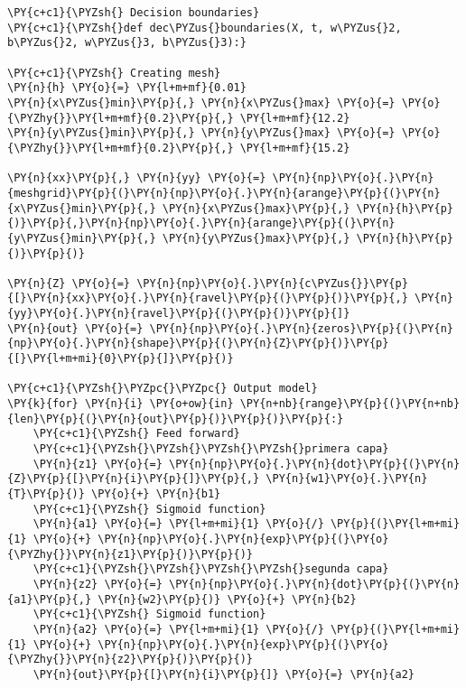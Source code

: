     \begin{tcolorbox}[breakable, size=fbox, boxrule=1pt, pad at break*=1mm,colback=cellbackground, colframe=cellborder]
\begin{Verbatim}[commandchars=\\\{\}]
\PY{c+c1}{\PYZsh{} Decision boundaries}
\PY{c+c1}{\PYZsh{}def dec\PYZus{}boundaries(X, t, w\PYZus{}2, b\PYZus{}2, w\PYZus{}3, b\PYZus{}3):}
    
\PY{c+c1}{\PYZsh{} Creating mesh}
\PY{n}{h} \PY{o}{=} \PY{l+m+mf}{0.01}
\PY{n}{x\PYZus{}min}\PY{p}{,} \PY{n}{x\PYZus{}max} \PY{o}{=} \PY{o}{\PYZhy{}}\PY{l+m+mf}{0.2}\PY{p}{,} \PY{l+m+mf}{12.2}
\PY{n}{y\PYZus{}min}\PY{p}{,} \PY{n}{y\PYZus{}max} \PY{o}{=} \PY{o}{\PYZhy{}}\PY{l+m+mf}{0.2}\PY{p}{,} \PY{l+m+mf}{15.2}
 
\PY{n}{xx}\PY{p}{,} \PY{n}{yy} \PY{o}{=} \PY{n}{np}\PY{o}{.}\PY{n}{meshgrid}\PY{p}{(}\PY{n}{np}\PY{o}{.}\PY{n}{arange}\PY{p}{(}\PY{n}{x\PYZus{}min}\PY{p}{,} \PY{n}{x\PYZus{}max}\PY{p}{,} \PY{n}{h}\PY{p}{)}\PY{p}{,}\PY{n}{np}\PY{o}{.}\PY{n}{arange}\PY{p}{(}\PY{n}{y\PYZus{}min}\PY{p}{,} \PY{n}{y\PYZus{}max}\PY{p}{,} \PY{n}{h}\PY{p}{)}\PY{p}{)}
 
\PY{n}{Z} \PY{o}{=} \PY{n}{np}\PY{o}{.}\PY{n}{c\PYZus{}}\PY{p}{[}\PY{n}{xx}\PY{o}{.}\PY{n}{ravel}\PY{p}{(}\PY{p}{)}\PY{p}{,} \PY{n}{yy}\PY{o}{.}\PY{n}{ravel}\PY{p}{(}\PY{p}{)}\PY{p}{]}
\PY{n}{out} \PY{o}{=} \PY{n}{np}\PY{o}{.}\PY{n}{zeros}\PY{p}{(}\PY{n}{np}\PY{o}{.}\PY{n}{shape}\PY{p}{(}\PY{n}{Z}\PY{p}{)}\PY{p}{[}\PY{l+m+mi}{0}\PY{p}{]}\PY{p}{)}
 
\PY{c+c1}{\PYZsh{}\PYZpc{}\PYZpc{} Output model}
\PY{k}{for} \PY{n}{i} \PY{o+ow}{in} \PY{n+nb}{range}\PY{p}{(}\PY{n+nb}{len}\PY{p}{(}\PY{n}{out}\PY{p}{)}\PY{p}{)}\PY{p}{:}
    \PY{c+c1}{\PYZsh{} Feed forward}
    \PY{c+c1}{\PYZsh{}\PYZsh{}\PYZsh{}\PYZsh{}primera capa}
    \PY{n}{z1} \PY{o}{=} \PY{n}{np}\PY{o}{.}\PY{n}{dot}\PY{p}{(}\PY{n}{Z}\PY{p}{[}\PY{n}{i}\PY{p}{]}\PY{p}{,} \PY{n}{w1}\PY{o}{.}\PY{n}{T}\PY{p}{)} \PY{o}{+} \PY{n}{b1} 
    \PY{c+c1}{\PYZsh{} Sigmoid function}
    \PY{n}{a1} \PY{o}{=} \PY{l+m+mi}{1} \PY{o}{/} \PY{p}{(}\PY{l+m+mi}{1} \PY{o}{+} \PY{n}{np}\PY{o}{.}\PY{n}{exp}\PY{p}{(}\PY{o}{\PYZhy{}}\PY{n}{z1}\PY{p}{)}\PY{p}{)} 
    \PY{c+c1}{\PYZsh{}\PYZsh{}\PYZsh{}\PYZsh{}segunda capa}
    \PY{n}{z2} \PY{o}{=} \PY{n}{np}\PY{o}{.}\PY{n}{dot}\PY{p}{(}\PY{n}{a1}\PY{p}{,} \PY{n}{w2}\PY{p}{)} \PY{o}{+} \PY{n}{b2}
    \PY{c+c1}{\PYZsh{} Sigmoid function}
    \PY{n}{a2} \PY{o}{=} \PY{l+m+mi}{1} \PY{o}{/} \PY{p}{(}\PY{l+m+mi}{1} \PY{o}{+} \PY{n}{np}\PY{o}{.}\PY{n}{exp}\PY{p}{(}\PY{o}{\PYZhy{}}\PY{n}{z2}\PY{p}{)}\PY{p}{)}
    \PY{n}{out}\PY{p}{[}\PY{n}{i}\PY{p}{]} \PY{o}{=} \PY{n}{a2}
    

\end{Verbatim}
\end{tcolorbox}
